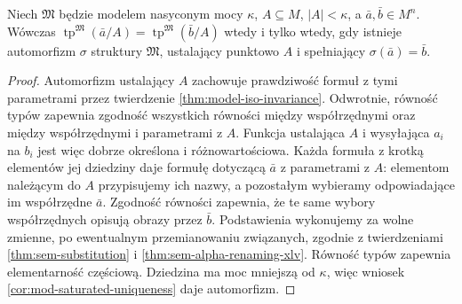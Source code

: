 \begin{wniosek}
\label{cor:mod-types-orbits}
Niech $\mathfrak M$ będzie modelem nasyconym mocy $\kappa$,
$A\subseteq M$, $|A|<\kappa$, a $\bar a,\bar b\in M^n$.
Wówczas
$\operatorname{tp}^{\mathfrak M}(\bar a/A)=
\operatorname{tp}^{\mathfrak M}(\bar b/A)$
wtedy i tylko wtedy, gdy istnieje automorfizm
$\sigma$ struktury $\mathfrak M$, ustalający punktowo $A$
i spełniający $\sigma(\bar a)=\bar b$.
\end{wniosek}
\begin{proof}
Automorfizm ustalający $A$ zachowuje prawdziwość
formuł z tymi parametrami przez twierdzenie
\ref{thm:model-iso-invariance}.
Odwrotnie, równość typów zapewnia zgodność wszystkich
równości między współrzędnymi oraz między współrzędnymi
i parametrami z $A$. Funkcja ustalająca $A$ i wysyłająca
$a_i$ na $b_i$ jest więc dobrze określona i
różnowartościowa. Każda formuła z krotką elementów
jej dziedziny daje formułę dotyczącą $\bar a$ z parametrami
z $A$: elementom należącym do $A$ przypisujemy ich nazwy,
a pozostałym wybieramy odpowiadające im współrzędne
$\bar a$. Zgodność równości zapewnia, że te same
wybory współrzędnych opisują obrazy przez $\bar b$.
Podstawienia wykonujemy za wolne zmienne, po ewentualnym
przemianowaniu związanych, zgodnie z twierdzeniami
\ref{thm:sem-substitution} i \ref{thm:sem-alpha-renaming-xlv}. Równość typów zapewnia elementarność częściową.
Dziedzina ma moc mniejszą od $\kappa$, więc wniosek
\ref{cor:mod-saturated-uniqueness} daje automorfizm.
\end{proof}

